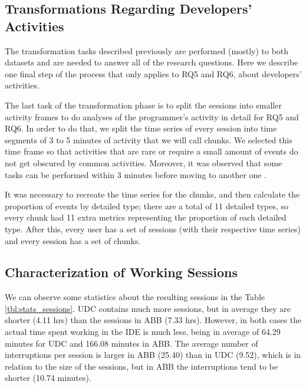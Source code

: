 \subsection{Transformations Regarding Developers' Activities}
The transformation tasks described previously are performed (mostly) to both datasets and are needed to answer all of the research questions. Here we describe one final step of the process that only applies to RQ5 and RQ6, about developers' activities.
\begin{changedforreviewerlong}

The last task of the transformation phase is to split the sessions into smaller activity frames to do analyses of the programmer's activity in detail for RQ5 and RQ6. In order to do that, we split the time series of every session into time segments of 3 to 5 minutes of activity that we will call chunks. We selected this time frame so that activities that are rare or require a small amount of events do not get obscured by common activities. Moreover, it was observed that some tasks can be performed within 3 minutes before moving to another one \cite{GM04}.

It was necessary to recreate the time series for the chunks, and then calculate the proportion of events by detailed type; there are a total of 11 detailed types, so every chunk had 11 extra metrics representing the proportion of each detailed type. After this, every user has a set of sessions (with their respective time series) and every session has a set of chunks.
\end{changedforreviewerlong}

\subsection{Characterization of Working Sessions}
We can observe some statistics about the resulting sessions in the Table \ref{tbl:stats_sessions}. UDC contains much more sessions, but in average they are shorter (4.11 hrs) than the sessions in ABB (7.33 hrs). However, in both cases the actual time spent working in the IDE is much less, being in average of 64.29 minutes for UDC and 166.08 minutes in ABB. The average number of interruptions per session is larger in ABB (25.40) than in UDC (9.52), which is in relation to the size of the sessions, but in ABB the interruptions tend to be shorter (10.74 minutes).

